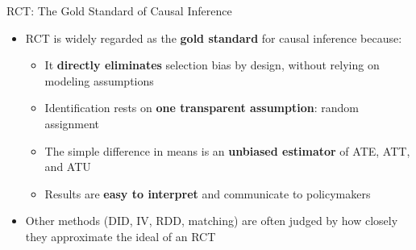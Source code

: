 \documentclass[hyperref={pdfpagelabels=false}]{beamer}
\begin{document}
	

	
	\begin{frame}{RCT: The Gold Standard of Causal Inference}
		\begin{itemize}
			\item RCT is widely regarded as the \textbf{gold standard} for causal inference because:
			\vspace{0.2cm}
			\begin{itemize}
				\item It \textbf{directly eliminates} selection bias by design, without relying on modeling assumptions
				\vspace{0.2cm}
				\item Identification rests on \textbf{one transparent assumption}: random assignment
				\vspace{0.2cm}
				\item The simple difference in means is an \textbf{unbiased estimator} of ATE, ATT, and ATU
				\vspace{0.2cm}
				\item Results are \textbf{easy to interpret} and communicate to policymakers
			\end{itemize}
			\vspace{0.3cm}
			\item Other methods (DID, IV, RDD, matching) are often judged by how closely they approximate the ideal of an RCT
		\end{itemize}
	\end{frame}
	
\end{document}
